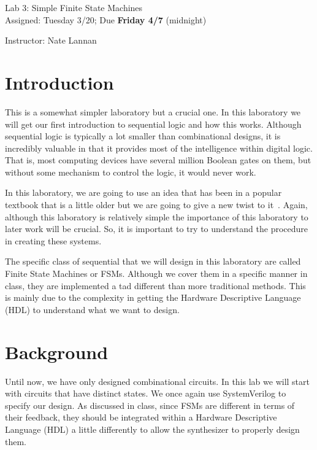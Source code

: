 \documentclass{article}
\newcommand{\myassignment}{Lab 3: Simple Finite State Machines}
\newcommand{\myduedate}{Assigned: Tuesday 3/20; Due \textbf{Friday 4/7} (midnight)}
\newcommand{\myinstructor}{Instructor: Nate Lannan}
\begin{document}
\begin{center}
  {\huge \myassignment} \\
  {\large \myduedate} \\
  \begin{flushright}
  \myinstructor \\
  \end{flushright}
\end{center}

\section{Introduction}

This is a somewhat simpler laboratory but a crucial one.  In this
laboratory we will get our first introduction to sequential logic and
how this works.  Although sequential logic is typically a lot smaller
than combinational designs, it is incredibly valuable in that it
provides most of the intelligence within digital logic.  That is, most
computing devices have several million Boolean gates on them, but
without some mechanism to control the logic, it would never work.

In this laboratory, we are going to use an idea that has been in a
popular textbook that is a little older but we are going to give a new
twist to it~\cite{DBLP:books/daglib/0067158}.  Again, although this
laboratory is relatively simple the importance of this laboratory to
later work will be crucial.  So, it is important to try to
understand the procedure in creating these systems.

The specific class of sequential that we will design in this
laboratory are called Finite State Machines or FSMs.  Although we cover them
in a specific manner in class, they are implemented a tad different
than more traditional methods.  This is mainly due to the complexity
in getting the Hardware Descriptive Language (HDL) to understand what
we want to design.

\section{Background}

Until now, we have only designed combinational circuits. In this lab
we will start with circuits that have distinct states. We once again use
SystemVerilog to specify our design.  As discussed in class, since
FSMs are different in terms of their feedback, they should be
integrated within a Hardware Descriptive Language (HDL) a little
differently to allow the synthesizer to properly design them.
\end{document}
